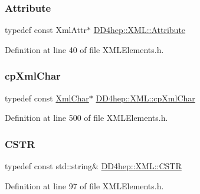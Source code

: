 \subsubsection{\texorpdfstring{Attribute}{Attribute}}
{\footnotesize\ttfamily typedef const Xml\+Attr$\ast$ \hyperlink{namespace_d_d4hep_1_1_x_m_l_a5c19b7116be99d69b4b22d911357baaf}{D\+D4hep\+::\+X\+M\+L\+::\+Attribute}}



Definition at line 40 of file X\+M\+L\+Elements.\+h.

\hypertarget{namespace_d_d4hep_1_1_x_m_l_a55d8459973c11d7c20ba5a1d7ef1242c}{}\label{namespace_d_d4hep_1_1_x_m_l_a55d8459973c11d7c20ba5a1d7ef1242c} 
\subsubsection{\texorpdfstring{cp\+Xml\+Char}{cpXmlChar}}
{\footnotesize\ttfamily typedef const \hyperlink{namespace_d_d4hep_1_1_x_m_l_a09e5d9cc86ed782f6826dfe0778c1815}{Xml\+Char}$\ast$ \hyperlink{namespace_d_d4hep_1_1_x_m_l_a55d8459973c11d7c20ba5a1d7ef1242c}{D\+D4hep\+::\+X\+M\+L\+::cp\+Xml\+Char}}



Definition at line 500 of file X\+M\+L\+Elements.\+h.

\hypertarget{namespace_d_d4hep_1_1_x_m_l_a4b167ca6b4f6763654721aef89a7089c}{}\label{namespace_d_d4hep_1_1_x_m_l_a4b167ca6b4f6763654721aef89a7089c} 
\subsubsection{\texorpdfstring{C\+S\+TR}{CSTR}}
{\footnotesize\ttfamily typedef const std\+::string\& \hyperlink{namespace_d_d4hep_1_1_x_m_l_a4b167ca6b4f6763654721aef89a7089c}{D\+D4hep\+::\+X\+M\+L\+::\+C\+S\+TR}}



Definition at line 97 of file X\+M\+L\+Elements.\+h.

\hypertarget{namespace_d_d4hep_1_1_x_m_l_a09e5d9cc86ed782f6826dfe0778c1815}{}\label{namespace_d_d4hep_1_1_x_m_l_a09e5d9cc86ed782f6826dfe0778c1815} 
